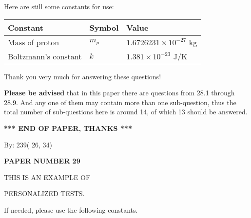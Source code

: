 \documentclass[12pt]{article}
\begin{document}
 
 
   
   
 \vspace{0.2in}
Here are still some constants for use:
 
 
\noindent\begin{tabular}{|l|l|l|}
\hline
Constant & Symbol & Value \\
\hline
 
Mass of proton &
$m_p$ &
 $ 1.6726231 \times 10^{-27} $
kg \\
\hline
 
Boltzmann's constant &
$k$ &
 $ 1.381 \times 10^{-23} $
J/K \\
\hline
 
\end{tabular}
 
Thank you very much for answering these questions!
 
{\textbf{\large{Please be advised}}} that in this paper there are questions from
28.1 through
28.9.
And any one of them may contain more than one sub-question, thus the total number
of sub-questions here is around 14, of which
13 should be answered.
 
   
   
   
   
\vspace{1.0in} 
{\textbf{\large{ *** END OF PAPER, THANKS *** }}} 
   
   
\hspace{1.0in} By: 
         239(         26,          34)
   
   
   
   
\newpage 
\setcounter{page}{ 
    29001 } 
   
   
   
   
 {\textbf{ \Large{ PAPER NUMBER          29 }}}
   
   
\vspace{0.2in}
   
   
   
   
   
   
 \vspace{0.2in}
 
 
{\Huge  THIS IS AN EXAMPLE OF}
 
{\Huge  PERSONALIZED TESTS. }
 
If needed, please use the following constants.
 
\end{document}
